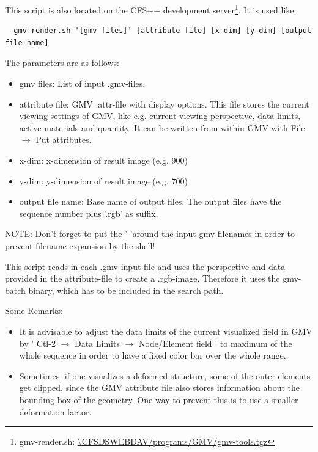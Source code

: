 \noindent   This   script  is   also   located   on   the  CFS++   development
server\footnote{gmv-render.sh:
\url{\CFSDSWEBDAV/programs/GMV/gmv-tools.tgz}}.
It is used like:

\begin{verbatim}
  gmv-render.sh '[gmv files]' [attribute file] [x-dim] [y-dim] [output file name]
\end{verbatim}

\noindent The parameters are as follows:

\begin{itemize}
    \item gmv files: List of input .gmv-files.
    \item  attribute file:  GMV  .attr-file with  display  options. This  file
stores  the  current  viewing  settings  of GMV,  like  e.g.  current  viewing
perspective, data  limits, active  materials and quantity.  It can  be written
from within GMV with File $\rightarrow$ Put attributes.
    \item x-dim: x-dimension of result image (e.g. 900)
    \item y-dim: y-dimension of result image (e.g. 700)
    \item output file  name: Base name of output files.  The output files have
the sequence number plus '.rgb' as suffix.
\end{itemize}

NOTE: Don't forget  to put the '  'around the input gmv filenames  in order to
prevent filename-expansion by the shell!

This script  reads in each .gmv-input  file and uses the  perspective and data
provided in the  attribute-file to create a .rgb-image.  Therefore it uses the
gmv-batch binary, which has to be included in the search path.

Some Remarks:

\begin{itemize}
    \item It is advisable to adjust  the data limits of the current visualized
field in GMV  by ' Ctl-2 $\rightarrow$ Data  Limits $\rightarrow$ Node/Element
field ' to  maximum of the whole sequence  in order to have a  fixed color bar
over the whole range.
    \item Sometimes, if one visualizes a deformed structure, some of the outer
elements get  clipped, since  the GMV attribute  file also  stores information
about the bounding  box of the geometry. One  way to prevent this is  to use a
smaller deformation factor.
\end{itemize}

